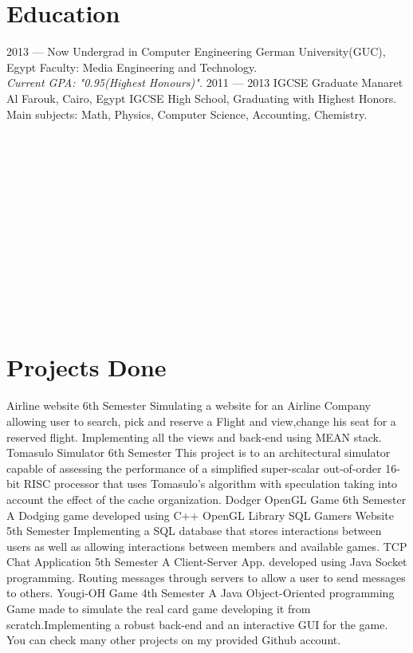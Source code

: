 \documentclass[]{friggeri-cv}
\begin{document}
\section{Education}
\begin{entrylist}
  \entry
    {2013 — Now}
    {Undergrad in Computer Engineering}
    {German University(GUC), Egypt}
    {Faculty: Media Engineering and Technology.\\
    \emph{Current GPA: "0.95(Highest Honours)".}}
  \entry
    {2011 — 2013}
    {IGCSE Graduate }
    {Manaret Al Farouk, Cairo, Egypt}
    {IGCSE High School, Graduating with Highest Honors.\\
    Main subjects: Math, Physics, Computer Science, Accounting, Chemistry.}
\end{entrylist}
\\
\\
\\
\\
\\
\\
\\
\\
\\
\\
\\
\\

\section{Projects Done}
\begin{entrylist}
  \entry
    {}
    {Airline website}
    {6th Semester}
    {Simulating a website for an Airline Company allowing user to search, pick and reserve a Flight and view,change his seat for a reserved flight. Implementing all the views and back-end using MEAN stack.}
   \entry
    {}
    {Tomasulo Simulator}
    {6th Semester}
    {This project is to an architectural simulator capable of assessing the performance of a simplified super-scalar out-of-order 16-bit RISC processor that uses Tomasulo’s algorithm with speculation taking into account the effect of the cache organization.}
   \entry
    {}
    {Dodger OpenGL Game}
    {6th Semester}
    {A Dodging game developed using C++ OpenGL Library}
 \entry
    {}
    {SQL Gamers Website}
    {5th Semester}
    {Implementing a SQL database that stores interactions between users as well as allowing interactions between members and available games.}
  \entry
    {}
    {TCP Chat Application}
    {5th Semester}
    {A Client-Server App. developed using Java Socket programming. Routing messages through servers to allow a user to send messages to others.}
 \entry
    {}
    {Yougi-OH Game}
    {4th Semester}
    {A Java Object-Oriented programming Game made to simulate the real card game developing it from scratch.Implementing a robust back-end and an interactive GUI for the game.\\}
 \entry
    {}
    {You can check many other projects on my provided Github account.}
    {}
    {}
\end{entrylist}
\end{document}
